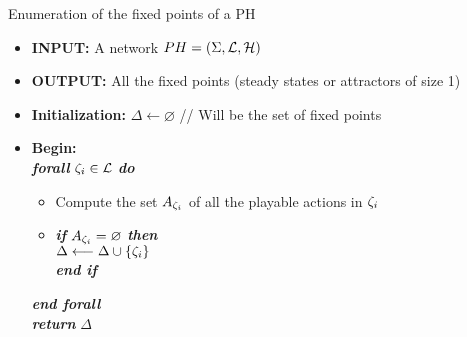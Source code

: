 \begin{algorithm}[t]
  \caption{Enumeration of the fixed points of a PH}
  \label{alg:PH-fixpont}
  \begin{itemize}
    \item[] \textbf{INPUT:} A network $PH=(\Sigma,\mathcal{L},\mathcal{H})$
    \item[] \textbf{OUTPUT:} All the fixed points (\ie steady states or attractors of size 1)
    \item[] \textbf{Initialization:} $\Delta \longleftarrow \varnothing$ \quad // Will be the set of fixed points
    \item[] \textbf{Begin:} \\
      \hspace{0.2cm}  \textbf{\textit{forall}} $\zeta_i \in \mathcal{L}$ \textbf{\textit{do}} 
        \begin{itemize}
          \item[] Compute the set $A_{\zeta_i}$ of all the playable actions in $\zeta_i$
          \item[] \textbf{\textit{if}} $A_{\zeta_i} = \varnothing$ \textbf{\textit{then}} \\
            \hspace{0.5cm}  $\Delta \longleftarrow \Delta \cup \{\zeta_i\}$ \\
           \textbf{\textit{end if}} 
        \end{itemize}   
      \hspace{0.2cm} \textbf{\textit{end forall}} \\    
      \hspace{0.2cm} \textbf{\textit{return}} $\Delta$    
  \end{itemize}
\end{algorithm}

